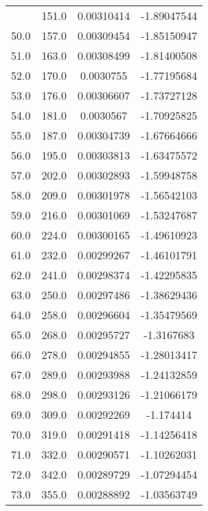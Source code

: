 \documentclass[
  captions=tableheading,
]{scrartcl}
\begin{document}
\begin{table}
\begin{tabular}{c c c c}
{49.0    &    151.0    &    0.00310414    &    -1.89047544\\
50.0    &    157.0    &    0.00309454    &    -1.85150947\\
51.0    &    163.0    &    0.00308499    &    -1.81400508\\
52.0    &    170.0    &    0.0030755    &    -1.77195684\\
53.0    &    176.0    &    0.00306607    &    -1.73727128\\
54.0    &    181.0    &    0.0030567    &    -1.70925825\\
55.0    &    187.0    &    0.00304739    &    -1.67664666\\
56.0    &    195.0    &    0.00303813    &    -1.63475572\\
57.0    &    202.0    &    0.00302893    &    -1.59948758\\
58.0    &    209.0    &    0.00301978    &    -1.56542103\\
59.0    &    216.0    &    0.00301069    &    -1.53247687\\
60.0    &    224.0    &    0.00300165    &    -1.49610923\\
61.0    &    232.0    &    0.00299267    &    -1.46101791\\
62.0    &    241.0    &    0.00298374    &    -1.42295835\\
63.0    &    250.0    &    0.00297486    &    -1.38629436\\
64.0    &    258.0    &    0.00296604    &    -1.35479569\\
65.0    &    268.0    &    0.00295727    &    -1.3167683\\
66.0    &    278.0    &    0.00294855    &    -1.28013417\\
67.0    &    289.0    &    0.00293988    &    -1.24132859\\
68.0    &    298.0    &    0.00293126    &    -1.21066179\\
69.0    &    309.0    &    0.00292269    &    -1.174414\\
70.0    &    319.0    &    0.00291418    &    -1.14256418\\
71.0    &    332.0    &    0.00290571    &    -1.10262031\\
72.0    &    342.0    &    0.00289729    &    -1.07294454\\
73.0    &    355.0    &    0.00288892    &    -1.03563749\\
\end{tabular}
\end{table}
\end{document}
